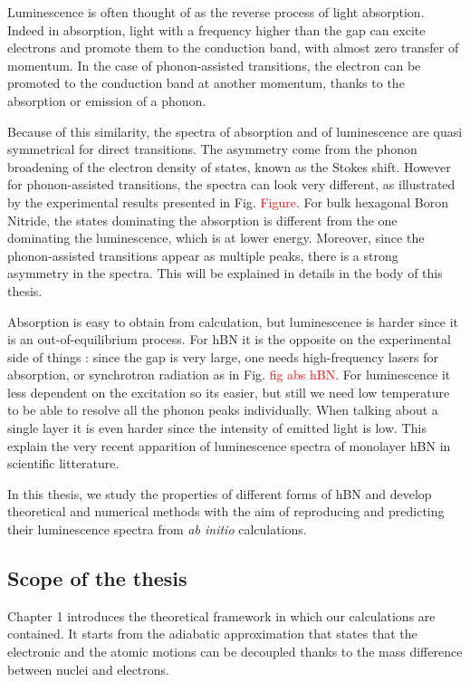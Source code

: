 Luminescence is often thought of as the reverse process of light absorption. Indeed in absorption, light with a frequency higher than the gap can excite electrons and promote them to the conduction band, with almost zero transfer of momentum. In the case of phonon-assisted transitions, the electron can be promoted to the conduction band at another momentum, thanks to the absorption or emission of a phonon. 

Because of this similarity, the spectra of absorption and of luminescence are quasi symmetrical for direct transitions. The asymmetry come from the phonon broadening of the electron density of states, known as the Stokes shift. However for phonon-assisted transitions, the spectra can look very different, as illustrated by the experimental results presented in Fig. \textcolor{red}{Figure}. For bulk hexagonal Boron Nitride, the states dominating the absorption is different from the one dominating the luminescence, which is at lower energy. Moreover, since the phonon-assisted transitions appear as multiple peaks, there is a strong asymmetry in the spectra. This will be explained in details in the body of this thesis.

Absorption is easy to obtain from calculation, but luminescence is harder since it is an out-of-equilibrium process. For hBN it is the opposite on the experimental side of things : since the gap is very large, one needs high-frequency lasers for absorption, or synchrotron radiation as in Fig. \textcolor{red}{fig abs hBN}. For luminescence it less dependent on the excitation so its easier, but still we need low temperature to be able to resolve all the phonon peaks individually. When talking about a single layer it is even harder since the intensity of emitted light is low. This explain the very recent apparition of luminescence spectra of monolayer hBN in scientific litterature.

In this thesis, we study the properties of different forms of hBN and develop theoretical and numerical methods with the aim of reproducing and predicting their luminescence spectra from \textit{ab initio} calculations.

\subsection{Scope of the thesis}
%
Chapter 1 introduces the theoretical framework in which our calculations are contained. It starts from the adiabatic approximation that states that the electronic and the atomic motions can be decoupled thanks to the mass difference between nuclei and electrons.

